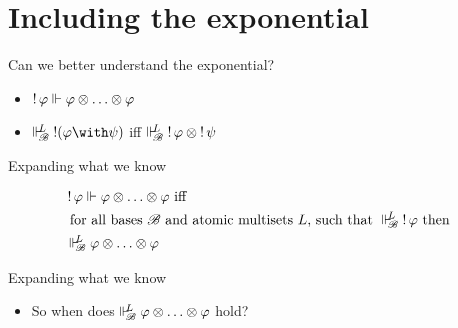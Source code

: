 \documentclass{beamer}
\begin{document}
\section{Including the exponential}
\begin{frame}{Can we better understand the exponential?}
\begin{itemize}	
	\item $\bang \varphi \suppM{}{} \varphi\mand\dots\mand\varphi$
	\vspace{5pt}
	\item $\suppM{\baseB}{L}\bang(\varphi\aand\psi)$ iff $\Vdash_{ \!\!\mathscr{B} }^{ \!\!L }\mathop{!}\varphi \otimes \mathop{!}\psi$
\end{itemize}
\end{frame}
\begin{frame}{Expanding what we know}
\begin{center}
\begin{align*}
&\bang\varphi \suppM{}{} \varphi \mand \ldots \mand \varphi \text{ iff } \\
&\text{ for all bases } \baseB \text{ and atomic multisets } L \text{, such that } \suppM{\baseB}{L} \bang\varphi \text{ then } \\ 
&\suppM{\baseB}{L} \varphi \mand \ldots \mand \varphi
\end{align*}
\end{center}
\end{frame}
\begin{frame}{Expanding what we know}
\begin{center}
\begin{itemize}
\item So when does $\Vdash_{ \!\!\mathscr{B} }^{ \!\!L } \varphi \otimes \ldots \otimes \varphi$ hold?
\end{itemize}
\end{center}
\end{frame}
\end{document}
